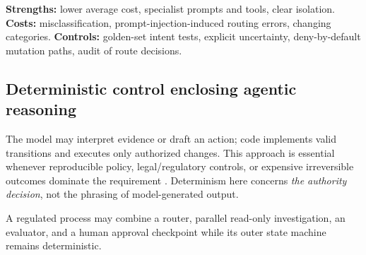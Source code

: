 \textbf{Strengths:} lower average cost, specialist prompts and tools, clear isolation. \textbf{Costs:} misclassification, prompt-injection-induced routing errors, changing categories. \textbf{Controls:} golden-set intent tests, explicit uncertainty, deny-by-default mutation paths, audit of route decisions.

\subsection{Deterministic control enclosing agentic reasoning}
The model may interpret evidence or draft an action; code implements valid transitions and executes only authorized changes. This approach is essential whenever reproducible policy, legal/regulatory controls, or expensive irreversible outcomes dominate the requirement \cite{databricks}. Determinism here concerns \emph{the authority decision}, not the phrasing of model-generated output.

\begin{notebox}
A regulated process may combine a router, parallel read-only investigation, an evaluator, and a human approval checkpoint while its outer state machine remains deterministic.
\end{notebox}
